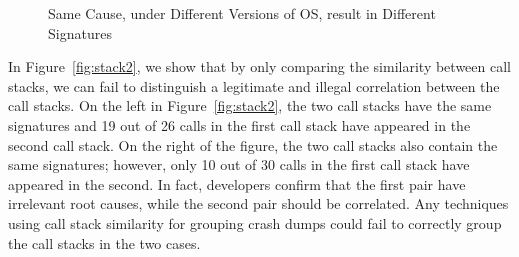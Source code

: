 \begin{figure}
\centering
{}
\caption{Same Cause, under Different Versions of OS, result in Different Signatures~\label{fig:group2}}
\end{figure}

In Figure~\ref{fig:stack2}, we show that by only comparing the similarity between call stacks, we can fail to distinguish a legitimate and illegal correlation between the call stacks. On the left in Figure~\ref{fig:stack2}, the two call stacks have the same signatures and 19 out of 26 calls in the first call stack have appeared in the second call stack. On the right of the figure, the two call stacks also contain the same signatures; however, only 10 out of 30 calls in the first call stack have appeared in the second. In fact, developers confirm that the first pair have irrelevant root causes, while the second pair should be correlated.  Any techniques using call stack similarity for grouping crash dumps could fail to correctly group the call stacks in the two cases.

